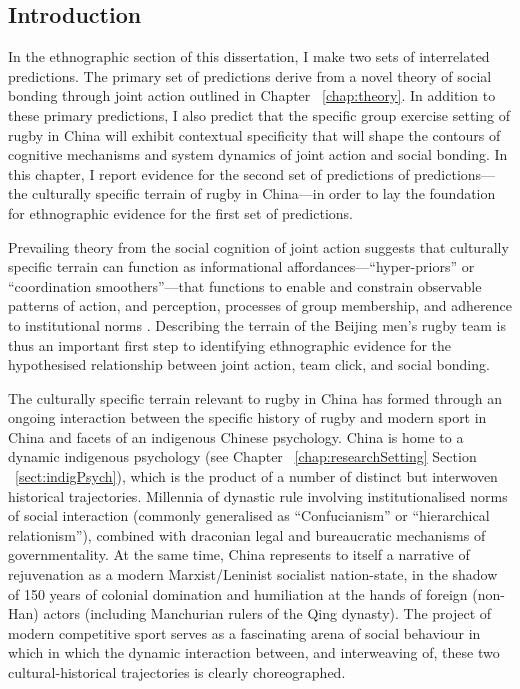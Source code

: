                                           \begin{CJK}{UTF8}{gbsn}

\section{Introduction}

In the ethnographic section of this dissertation, I make two sets of interrelated predictions.  The primary set of predictions derive from a novel theory of social bonding through joint action outlined in Chapter ~\ref{chap:theory}.  In addition to these primary predictions, I also predict that the specific group exercise setting of rugby in China will exhibit contextual specificity that will shape the contours of cognitive mechanisms and system dynamics of joint action and social bonding.  In this chapter, I report evidence for the second set of predictions of predictions---the culturally specific terrain of rugby in China---in order to lay the foundation for ethnographic evidence for the first set of predictions.

Prevailing theory from the social cognition of joint action suggests that culturally specific terrain can function as informational affordances---``hyper-priors'' or ``coordination smoothers''---that functions to enable and constrain observable patterns of action, and perception, processes of group membership, and adherence to institutional norms \citep{Clark2015}.  Describing the terrain of the Beijing men's rugby team is thus an important first step to identifying ethnographic evidence for the hypothesised relationship between joint action, team click, and social bonding.

The culturally specific terrain relevant to rugby in China has formed through an ongoing interaction between the specific history of rugby and modern sport in China and facets of an indigenous Chinese psychology.  China is home to a dynamic indigenous psychology (see Chapter ~\ref{chap:researchSetting} Section ~\ref{sect:indigPsych}), which is the product of a number of distinct but interwoven historical trajectories.   Millennia of dynastic rule involving institutionalised norms of social interaction (commonly generalised as ``Confucianism'' or ``hierarchical relationism''), combined with draconian legal and bureaucratic mechanisms of governmentality.  At the same time, China represents to itself a narrative of rejuvenation as a modern Marxist/Leninist socialist nation-state, in the shadow of 150 years of colonial domination and humiliation at the hands of foreign (non-Han) actors (including Manchurian rulers of the Qing dynasty).  The project of modern competitive sport serves as a fascinating arena of social behaviour in which in which the dynamic interaction between, and interweaving of, these two cultural-historical trajectories is clearly choreographed.


\end{CJK}
